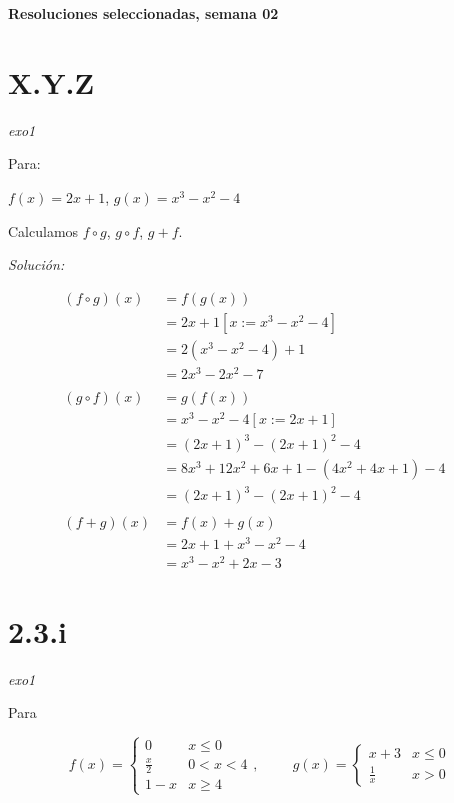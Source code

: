 \documentclass[10pt,a4paper]{article}
\renewcommand{\o}{\circ}
\begin{document}
\vspace{0,3cm}

\begin{center}
{\bf \Large Resoluciones seleccionadas, semana 02}
\end{center}

\vspace{0,3cm}

\section*{X.Y.Z}\emph{exo1}


\noindent
Para:

$ f(x) = 2x + 1$, \hspace{2cm} $g(x) = x^{3} - x^{2} - 4 $

\noindent
Calculamos $f \o g$, $g \o f$, $g + f$.


\noindent
\emph{Solución:}

\begin{align*}
  (f \o g)(x)
  &= f(g (x)) &\\
  &= 2x+1 [x:= x^3-x^2-4] &\\
  &= 2 (x^3-x^2-4)+1 &\\
  &= 2x^3-2x^2-7 &\\ \\
  (g \o f)(x)
  &= g (f (x)) &\\
  &= x^3-x^2-4[x:= 2x+1] &\\
  &= (2x+1)^3-(2x+1)^2-4 &\\
  &= 8 x^3 + 12 x^2 + 6 x + 1 - (4 x^2 + 4 x + 1) - 4 &\\
  &= (2x+1)^3-(2x+1)^2-4 & \\ \\
  (f + g) (x)
  &= f(x) + g (x) &\\
  &= 2x + 1 + x^3 - x^2 - 4 &\\
  &= x^3 - x^2 + 2x -3&
\end{align*}




\section*{2.3.i}\emph{exo1}


\noindent
Para

$$f(x) = \left \{ \begin{matrix} 0 & x \leq 0
\\ \frac{x}{2} & 0 < x < 4 
\\ 1- x & x \geq 4 \end{matrix}\right. , \hspace{1cm}
g(x) = \left \{ \begin{matrix} x +3 & x \leq 0
\\  \frac{1}{x} & x > 0 \end{matrix}\right.$$
\end{document}
